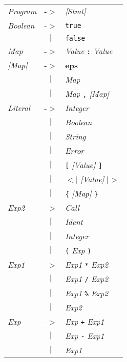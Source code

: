 \documentclass{article}
\begin{document}
\begin{tabular}{lll}
\textit{Program} & -$>$ & \textit{[Stmt]} \\
\textit{Boolean} & -$>$ & \texttt{true} \\
 & \multicolumn{1}{c}{\textbf{$|$}} & \texttt{false} \\
\textit{Map} & -$>$ & \textit{Value} \texttt{:} \textit{Value} \\
\textit{[Map]} & -$>$ & \textbf{eps} \\
 & \multicolumn{1}{c}{\textbf{$|$}} & \textit{Map} \\
 & \multicolumn{1}{c}{\textbf{$|$}} & \textit{Map} \texttt{,} \textit{[Map]} \\
\textit{Literal} & -$>$ & \textit{Integer} \\
 & \multicolumn{1}{c}{\textbf{$|$}} & \textit{Boolean} \\
 & \multicolumn{1}{c}{\textbf{$|$}} & \textit{String} \\
 & \multicolumn{1}{c}{\textbf{$|$}} & \textit{Error} \\
 & \multicolumn{1}{c}{\textbf{$|$}} & \texttt{[} \textit{[Value]} \texttt{]} \\
 & \multicolumn{1}{c}{\textbf{$|$}} & \texttt{$<$$|$} \textit{[Value]} \texttt{$|$$>$} \\
 & \multicolumn{1}{c}{\textbf{$|$}} & \texttt{\{} \textit{[Map]} \texttt{\}} \\
\textit{Exp2} & -$>$ & \textit{Call} \\
 & \multicolumn{1}{c}{\textbf{$|$}} & \textit{Ident} \\
 & \multicolumn{1}{c}{\textbf{$|$}} & \textit{Integer} \\
 & \multicolumn{1}{c}{\textbf{$|$}} & \texttt{(} \textit{Exp} \texttt{)} \\
\textit{Exp1} & -$>$ & \textit{Exp1} \texttt{*} \textit{Exp2} \\
 & \multicolumn{1}{c}{\textbf{$|$}} & \textit{Exp1} \texttt{/} \textit{Exp2} \\
 & \multicolumn{1}{c}{\textbf{$|$}} & \textit{Exp1} \texttt{\%} \textit{Exp2} \\
 & \multicolumn{1}{c}{\textbf{$|$}} & \textit{Exp2} \\
\textit{Exp} & -$>$ & \textit{Exp} \texttt{+} \textit{Exp1} \\
 & \multicolumn{1}{c}{\textbf{$|$}} & \textit{Exp} \texttt{-} \textit{Exp1} \\
 & \multicolumn{1}{c}{\textbf{$|$}} & \textit{Exp1} \\

\end{tabular}
\end{document}
